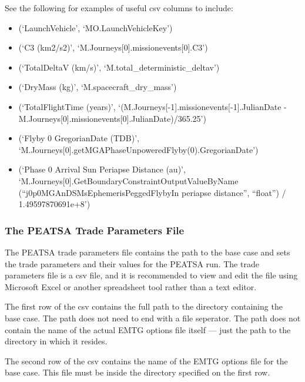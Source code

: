 \begin{itemize}
	See the following for examples of useful csv columns to include:
	\begin{itemize}
		\item (`LaunchVehicle', `MO.LaunchVehicleKey')
		\item (`C3 (km2/s2)', `M.Journeys[0].missionevents[0].C3')
		\item (`TotalDeltaV (km/s)', `M.total\_deterministic\_deltav')
		\item (`DryMass (kg)', `M.spacecraft\_dry\_mass')
		\item (`TotalFlightTime (years)', `(M.Journeys[-1].missionevents[-1].JulianDate - \\M.Journeys[0].missionevents[0].JulianDate)/365.25')
		\item (`Flyby 0 GregorianDate (TDB)', \\`M.Journeys[0].getMGAPhaseUnpoweredFlyby(0).GregorianDate')
		\item (`Phase 0 Arrival Sun Periapse Distance (au)', \\`M.Journeys[0].GetBoundaryConstraintOutputValueByName\\(``j0p0MGAnDSMsEphemerisPeggedFlybyIn periapse distance'', ``float'') / 1.49597870691e+8')
	\end{itemize}
\end{itemize}

\subsubsection{The PEATSA Trade Parameters File}
\label{sec:peatsa_trade_parameters_file}

The \ac{PEATSA} trade parameters file contains the path to the base case and sets the trade parameters and their values for the \ac{PEATSA} run. The trade parameters file is a csv file, and it is recommended to view and edit the file using Microsoft Excel or another spreadsheet tool rather than a text editor.

\noindent The first row of the csv contains the full path to the directory containing the base case. The path does not need to end with a file seperator. The path does not contain the name of the actual \ac{EMTG} options file itself --- just the path to the directory in which it resides.

\noindent The second row of the csv contains the name of the \ac{EMTG} options file for the base case. This file must be inside the directory specified on the first row.

